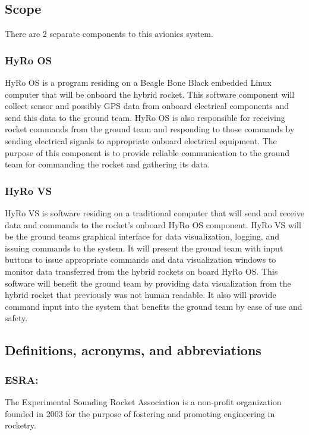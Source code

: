 \documentclass[10pt,draftclsnofoot,onecolumn,compsoc]{IEEEtran}
\begin{document}
\subsection{Scope}
 There are 2 separate components to this avionics system. 

\subsubsection{HyRo OS}
HyRo OS is a program residing on a Beagle Bone Black embedded Linux computer that will be onboard the hybrid rocket. This software component will collect sensor and possibly
 GPS data from onboard electrical components and send this data to the ground team. HyRo OS is also responsible for receiving rocket commands from the ground team and responding to those
 commands by sending electrical signals to appropriate onboard electrical equipment. The purpose of this component is to provide reliable communication to the ground team for commanding
the rocket and gathering its data. 
\subsubsection{HyRo VS}
HyRo VS is software residing on a traditional computer that will send and receive data and commands to the rocket's onboard HyRo OS component. HyRo VS will be the ground teams graphical interface for data visualization, logging, and issuing commands to the system. It will present the ground team with input buttons to issue appropriate commands and data visualization windows to monitor data transferred from the hybrid rockets on board HyRo OS. This software will benefit the ground team by providing data visualization from the hybrid rocket that previously was not human readable. It also will provide command input into the system that benefits the ground team by ease of use and safety.

\subsection{Definitions, acronyms, and abbreviations}
\subsubsection{\bf ESRA:}  The Experimental Sounding Rocket Association is a non-profit organization founded in 2003 for the purpose of fostering and promoting engineering in rocketry.
\end{document}
